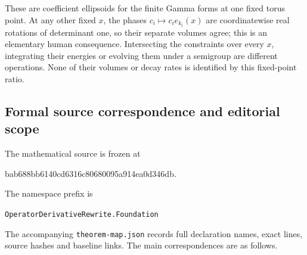 \documentclass[11pt]{article}
\theoremstyle{remark}\newtheorem{remark}[theorem]{Remark}
\newcommand{\code}[1]{{\small\nolinkurl{#1}}}
\begin{document}
These are coefficient ellipsoids for the finite Gamma forms at one fixed
torus point. At any other fixed $x$, the phases $c_i\mapsto c_ie_{k_i}(x)$
are coordinatewise real rotations of determinant one, so their separate
volumes agree; this is an elementary human consequence. Intersecting
the constraints over every $x$, integrating their energies or evolving
them under a semigroup are different operations. None of their volumes
or decay rates is identified by this fixed-point ratio.

\begin{samepage}
\section{Formal source correspondence and editorial scope}
The mathematical source is frozen at
\begin{center}\small\ttfamily
bab688bb6140cd6316c80680095a914ea0d346db.
\end{center}
The namespace prefix is
\begin{center}\code{OperatorDerivativeRewrite.Foundation}\end{center}
\end{samepage}
The accompanying \code{theorem-map.json} records full
declaration names, exact lines, source hashes and baseline links.
The main correspondences are as follows.
\end{document}
